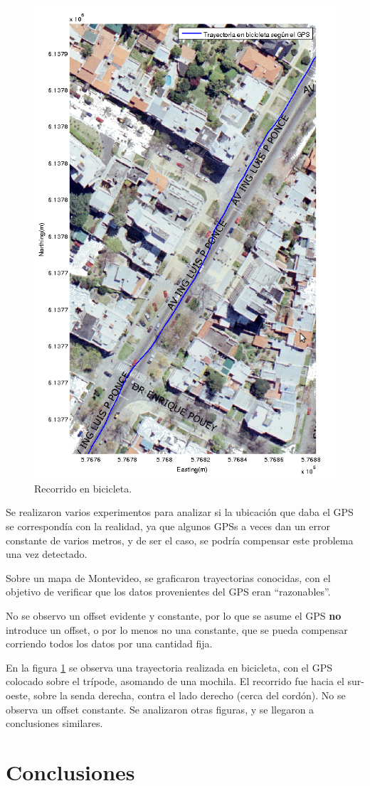 \documentclass[main]{subfiles}
\begin{document}
\begin{figure}
  \begin{center}
\vspace{-80pt}
  \includegraphics[height=.6\textwidth]{./pics_gps/ponce.png}
  \end{center}
\vspace{-20pt}
  \caption{Recorrido en bicicleta.}
  \label{fig:ponce.png}
\vspace{-30pt}
\end{figure}

Se realizaron varios experimentos para analizar si la ubicación que daba el GPS se correspondía con la realidad, ya que algunos GPSs a veces dan un error constante de varios metros, y de ser el caso, se podría compensar este problema una vez detectado.

Sobre un mapa de Montevideo, se graficaron trayectorias conocidas, con el objetivo de verificar que los datos provenientes del GPS eran ``razonables''.

No se observo un offset evidente y constante, por lo que se asume el GPS \textbf{no} introduce un offset, o por lo menos no una constante, que se pueda compensar corriendo todos los datos por una cantidad fija.

En la figura \ref{fig:ponce.png} se observa una trayectoria realizada en bicicleta, con el GPS colocado sobre el trípode, asomando de una mochila. El recorrido fue hacia el sur-oeste, sobre la senda derecha, contra el lado derecho (cerca del cordón). No se observa un offset constante. Se analizaron otras figuras, y se llegaron a conclusiones similares.

\newpage
\section{Conclusiones}
\label{sec:conclusion}
\end{document}
